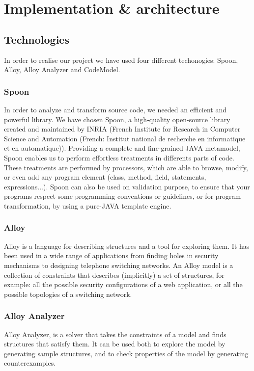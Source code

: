 \section{Implementation \& architecture}
\label{sec:Implementation}
\subsection{Technologies}
In order to realise our project we have used four different techonogies: Spoon, Alloy, Alloy Analyzer and CodeModel.

\subsubsection{Spoon}
In order to analyze and transform source code, we needed an efficient and powerful library.
We have chosen Spoon, a high-quality open-source library created and maintained by INRIA
(French Institute for Research in Computer Science and Automation (French: Institut national
de recherche en informatique et en automatique)). Providing a complete and fine-grained
JAVA metamodel, Spoon enables us to perform effortless treatments in differents parts of code.
These treatments are performed by processors, which are able to browse, modify, or even add
any program element (class, method, field, statements, expressions...).\cite{spoon-gforge}\cite{spoon-hal}
Spoon can also be used on validation purpose, to ensure that your programs respect some
programming conventions or guidelines, or for program transformation, by using a pure-JAVA
template engine.\cite{spoon-javasource}
\subsubsection{Alloy}
Alloy is a language for describing structures and a tool for exploring them. It has been used in a wide range of applications from finding holes in security mechanisms to designing telephone switching networks.
An Alloy model is a collection of constraints that describes (implicitly) a set of structures, for example: all the possible security configurations of a web application, or all the possible topologies of a switching network.\cite{alloy}

\subsubsection{Alloy Analyzer}
Alloy Analyzer, is a solver that takes the constraints of a model and finds structures that satisfy them. It can be used both to explore the model by generating sample structures, and to check properties of the model by generating counterexamples.\cite{alloy}

